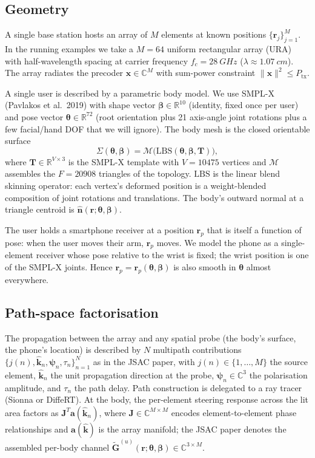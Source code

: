 \documentclass[11pt,a4paper]{article}
\theoremstyle{definition}
\newcommand{\khat}{\hat{\bm{k}}}
\newcommand{\nhat}{\hat{\bm{n}}}
\newcommand{\rr}{\mathbf{r}}
\newcommand{\Reals}{\mathbb{R}}
\newcommand{\Complex}{\mathbb{C}}
\newcommand{\Gtil}{\tilde{\mathbf{G}}}
\newcommand{\xvec}{\mathbf{x}}
\newcommand{\thetab}{\bm{\theta}}
\newcommand{\betab}{\bm{\beta}}
\newcommand{\Mmesh}{\mathcal{M}}
\newcommand{\LBS}{\mathrm{LBS}}
\begin{document}
\subsection{Geometry}

A single base station hosts an array of $M$ elements at known
positions $\{\rr_j\}_{j=1}^M$.  In the running examples we take a
$M=64$ uniform rectangular array (URA) with half-wavelength spacing
at carrier frequency $f_c=\SI{28}{GHz}$
($\lambda\approx\SI{1.07}{cm}$).  The array radiates the precoder
$\xvec\in\Complex^M$ with sum-power constraint
$\|\xvec\|^2\le P_{\mathrm{tx}}$.

A single user is described by a parametric body model.  We use
SMPL-X (Pavlakos et al.\ 2019) with shape vector $\betab\in\Reals^{10}$
(identity, fixed once per user) and pose vector
$\thetab\in\Reals^{72}$ (root orientation plus 21 axis-angle joint
rotations plus a few facial/hand DOF that we will ignore).  The body
mesh is the closed orientable surface
\begin{equation}\label{eq:mesh}
  \Sigma(\thetab,\betab)
   =\Mmesh\bigl(\LBS(\thetab,\betab,\mathbf{T})\bigr),
\end{equation}
where $\mathbf{T}\in\Reals^{V\times 3}$ is the SMPL-X template with
$V=\num{10475}$ vertices and $\Mmesh$ assembles the $F=\num{20908}$
triangles of the topology.  $\LBS$ is the linear blend skinning
operator: each vertex's deformed position is a
weight-blended composition of joint rotations and translations.  The
body's outward normal at a triangle centroid is
$\nhat(\rr;\thetab,\betab)$.

The user holds a smartphone receiver at a position $\rr_p$ that is
itself a function of pose: when the user moves their arm, $\rr_p$
moves.  We model the phone as a single-element receiver whose pose
relative to the wrist is fixed; the wrist position is one of the
SMPL-X joints.  Hence $\rr_p=\rr_p(\thetab,\betab)$ is also smooth
in $\thetab$ almost everywhere.

\subsection{Path-space factorisation}

The propagation between the array and any spatial probe (the body's
surface, the phone's location) is described by $N$ multipath
contributions $\{j(n),\khat_n,\bm\psi_n,\tau_n\}_{n=1}^N$ as in the
JSAC paper, with $j(n)\in\{1,\dots,M\}$ the source element, $\khat_n$
the unit propagation direction at the probe, $\bm\psi_n\in\Complex^3$
the polarisation amplitude, and $\tau_n$ the path delay.  Path
construction is delegated to a ray tracer (Sionna or DiffeRT).  At
the body, the per-element steering response across the lit area
factors as $\mathbf{J}^T\mathbf{a}(\khat_n)$, where $\mathbf{J}\in
\Complex^{M\times M}$ encodes element-to-element phase relationships
and $\mathbf{a}(\khat)$ is the array manifold; the JSAC paper denotes
the assembled per-body channel
$\Gtil^{(u)}(\rr;\thetab,\betab)\in\Complex^{3\times M}$.
\end{document}
